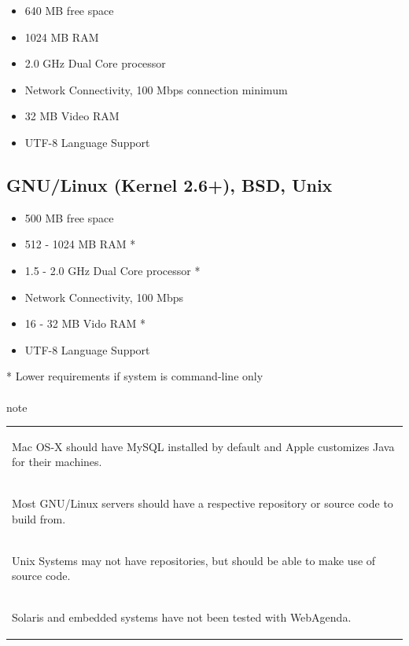 \documentclass[a4paper,10pt]{report}
\begin{document}
\begin{itemize}
 \item 640 MB free space
 \item 1024 MB RAM
 \item 2.0 GHz Dual Core processor
 \item Network Connectivity, 100 Mbps connection minimum
 \item 32 MB Video RAM
 \item UTF-8 Language Support
\end{itemize}

\subsection*{GNU/Linux (Kernel 2.6+), BSD, Unix}

\begin{itemize}
 \item 500 MB free space
 \item 512 - 1024 MB RAM *
 \item 1.5 - 2.0 GHz Dual Core processor *
 \item Network Connectivity, 100 Mbps
 \item 16 - 32 MB Vido RAM *
 \item UTF-8 Language Support
\end{itemize}

\begin{small} * Lower requirements if system is command-line only \end{small}
\paragraph{}

\begin{color}{note}
\begin{center}
\begin{tabular}{| l |}
\hline
  \begin{footnotesize}
  Mac OS-X should have MySQL installed by default and Apple customizes Java for their machines. 
  \end{footnotesize} \\
  \begin{footnotesize}
  Most GNU/Linux servers should have a respective repository or source code to build from.
  \end{footnotesize} \\
  \begin{footnotesize}
  Unix Systems may not have repositories, but should be able to make use of source code.
  \end{footnotesize} \\
  \begin{footnotesize}
   Solaris and embedded systems have not been tested with WebAgenda.
  \end{footnotesize} \\
\hline
\end{tabular}
\end{center}
\end{color}
\par \noindent \hspace*{1cm} 
\end{document}
